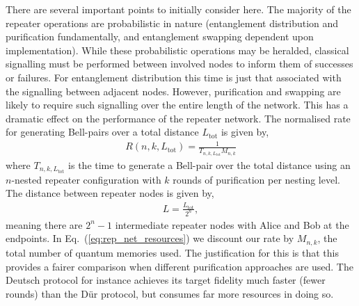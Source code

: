 There are several important points to initially consider here. The majority of the repeater operations are probabilistic in nature (entanglement distribution and purification fundamentally, and entanglement swapping dependent upon implementation). While these probabilistic operations may be heralded, classical signalling must be performed between involved nodes  to inform them of successes or failures. For entanglement distribution this time is just that associated with the signalling between adjacent nodes. However, purification and swapping are likely to require such signalling over the entire length of the network. This has a dramatic effect on the performance of the repeater network. The normalised rate for generating Bell-pairs over a total distance $L_\mathrm{tot}$ is given by,
\begin{align}
R(n,k,L_\mathrm{tot})= \frac{1}{T_{n,k,L_\mathrm{tot}} M_{n,k}}
\label{eq:rep_net_resources}
\end{align}
where $T_{n,k,L_\mathrm{tot}}$ is the time to generate a Bell-pair over the total distance using an $n$-nested repeater configuration with $k$ rounds of purification per nesting level. The distance between repeater nodes is given by,
\begin{align}
	L=\frac{L_\mathrm{tot}}{2^n},
\end{align}
meaning there are \mbox{$2^n-1$} intermediate repeater nodes with Alice and Bob at the endpoints. In Eq.~(\ref{eq:rep_net_resources}) we discount our rate by $M_{n,k}$, the total number of quantum memories used. The justification for this is that this provides a fairer comparison when different purification approaches are used. The Deutsch protocol for instance achieves its target fidelity much faster (fewer rounds) than the D{\"u}r protocol, but consumes far more resources in doing so.

